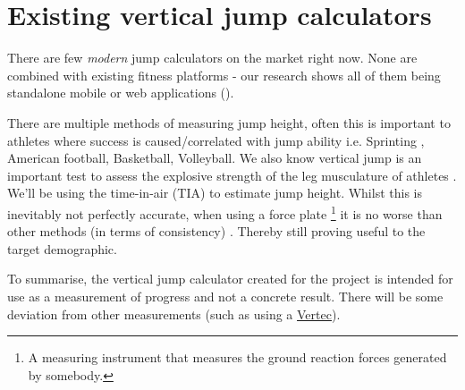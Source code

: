 \section{Existing vertical jump calculators}
There are few \textit{modern} jump calculators on the market right now. None are combined with existing fitness platforms -
our research shows all of them being standalone mobile or web applications ().
\par
There are multiple methods of measuring jump height, often this is important to athletes 
where success is caused/correlated with jump ability i.e. Sprinting \cite{jump-sprint-link}, American football, Basketball, Volleyball.
We also know vertical jump is an important test to assess the explosive strength of the leg
musculature of athletes \cite{aspects-of-strength,nsa-strength-in-athletes}.
We'll be using the time-in-air (TIA) to estimate jump height. Whilst this is inevitably not perfectly
accurate, when using a force plate \footnote{A measuring instrument that measures the ground reaction forces generated by somebody.}
it is no worse than other methods (in terms of consistency) \cite{measuring-jump-paper}.
Thereby still proving useful to the target demographic.
\par
To summarise, the vertical jump calculator created for the project is intended for use as a measurement of progress
and not a concrete result. There will be some deviation from other measurements (such as using a \href{https://www.topendsports.com/testing/products/vertical-jump/vertec.htm}{Vertec}).
\pagebreak 

